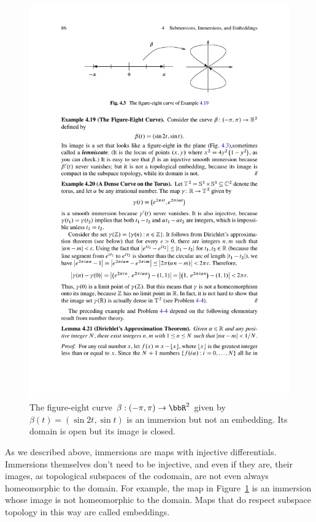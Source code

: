 \begin{figure}[tp]
    \centering
    \includegraphics{figures/immersion.pdf}
    \caption{The figure-eight curve $\beta:(-\pi,\pi)\to \bbR^2$ given by $\beta(t)=(\sin 2t,\sin t)$ is an immersion but not an embedding. Its domain is open but its image is closed.}
    \label{fig:immersion}
\end{figure}

As we described above, immersions are maps with injective differentials. Immersions themselves don't need to be injective, and even if they are, their images, as topological subspaces of the codomain, are not even always homeomorphic to the domain. For example, the map in Figure~\ref{fig:immersion} is an immersion whose image is not homeomorphic to the domain. Maps that do respect subspace topology in this way are called embeddings.

